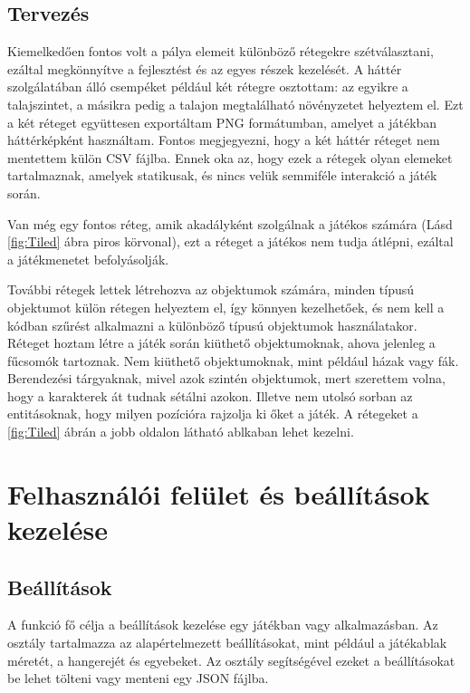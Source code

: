 \subsection{Tervezés} \label{subsec:Tervezés}

 Kiemelkedően fontos volt a pálya elemeit különböző rétegekre szétválasztani, ezáltal megkönnyítve a fejlesztést és az egyes részek kezelését. A háttér szolgálatában álló csempéket például két rétegre osztottam: az egyikre a talajszintet, a másikra pedig a talajon megtalálható növényzetet helyeztem el. Ezt a két réteget együttesen exportáltam PNG formátumban, amelyet a játékban háttérképként használtam. Fontos megjegyezni, hogy a két háttér réteget nem mentettem külön CSV fájlba. Ennek oka az, hogy ezek a rétegek olyan elemeket tartalmaznak, amelyek statikusak, és nincs velük semmiféle interakció a játék során. 

Van még egy fontos réteg, amik akadályként szolgálnak a játékos számára (Lásd \ref{fig:Tiled} ábra piros körvonal), ezt a réteget a játékos nem tudja átlépni, ezáltal a játékmenetet befolyásolják.  

További rétegek lettek létrehozva az objektumok számára, minden típusú objektumot külön rétegen helyeztem el, így könnyen kezelhetőek, és nem kell a kódban szűrést alkalmazni a különböző típusú objektumok használatakor.
Réteget hoztam létre a játék során kiüthető objektumoknak, ahova jelenleg a fűcsomók tartoznak. Nem kiüthető objektumoknak, mint például házak vagy fák. Berendezési tárgyaknak, mivel azok szintén objektumok, mert szerettem volna, hogy a karakterek át tudnak sétálni azokon. Illetve nem utolsó sorban az entitásoknak, hogy milyen pozícióra rajzolja ki őket a játék. A rétegeket a \ref{fig:Tiled} ábrán a jobb oldalon látható ablkaban lehet kezelni. 

\section{Felhasználói felület és beállítások kezelése}

\subsection{Beállítások}
 A funkció fő célja a beállítások kezelése egy játékban vagy alkalmazásban. Az osztály tartalmazza az alapértelmezett beállításokat, mint például a játékablak méretét, a hangerejét és egyebeket. Az osztály segítségével ezeket a beállításokat be lehet tölteni vagy menteni egy JSON fájlba.

